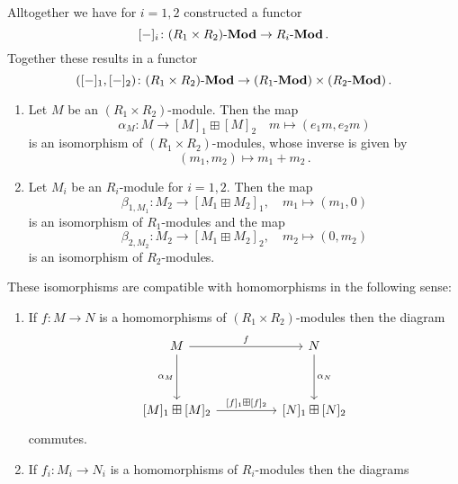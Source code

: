\begin{remark}
  \label{remark: functor into product}
  Alltogether we have for $i = 1, 2$ constructed a functor
  \[
            [-]_i
    \colon  (R_1 \times R_2)\text{-}\mathbf{Mod}
    \to     R_i\text{-}\mathbf{Mod} \,.
  \]
  Together these results in a functor
  \[
            ([-]_1, [-]_2)
    \colon  (R_1 \times R_2)\text{-}\mathbf{Mod}
    \to     (R_1\text{-}\mathbf{Mod}) \times (R_2\text{-}\mathbf{Mod}) \,.
  \]
\end{remark}


\begin{theorem}
  \label{theorem: equivalence of modules for objects}
  \leavevmode
  \begin{enumerate}
    \item
      Let $M$ be an $(R_1 \times R_2)$-module.
      Then the map
      \[
                \alpha_M
        \colon  M
        \to     [M]_1 \boxplus [M]_2
        \quad   m
        \mapsto (e_1 m, e_2 m)
      \]
      is an isomorphism of $(R_1 \times R_2)$-modules, whose inverse is given by
      \[
                (m_1, m_2)
        \mapsto m_1 + m_2 \,.
      \]
    \item
      Let $M_i$ be an $R_i$-module for $i = 1, 2$.
      Then the map
      \[
                \beta_{1, M_1}
        \colon  M_2
        \to     [M_1 \boxplus M_2]_1,
        \quad   m_1
        \mapsto (m_1, 0)
      \]
      is an isomorphism of $R_1$-modules and the map
      \[
                \beta_{2, M_2}
        \colon  M_2
        \to     [M_1 \boxplus M_2]_2,
        \quad   m_2
        \mapsto (0, m_2)
      \]
      is an isomorphism of $R_2$-modules.
  \end{enumerate}
  These isomorphisms are compatible with homomorphisms in the following sense:
  \begin{enumerate}[resume]
    \item
      If $f \colon M \to N$ is a homomorphisms of $(R_1 \times R_2)$-modules then the diagram
      \[
        \begin{tikzcd}[sep = huge]
            M
            \arrow{r}[above]{f}
            \arrow{d}[left]{\alpha_M}
          & N
            \arrow{d}[right]{\alpha_N}
          \\
            {[M]_1} \boxplus {[M]_2}
            \arrow{r}[above]{{[f]_1} \boxplus {[f]_2}}
          & {[N]_1} \boxplus {[N]_2}
        \end{tikzcd}
      \]
      commutes.
    \item
      If $f_i \colon M_i \to N_i$ is a homomorphisms of $R_i$-modules then the diagrams
      \[
\]
\end{enumerate}
\end{theorem}
